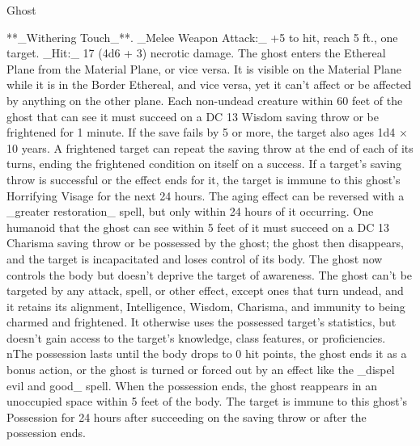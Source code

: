 \begin{DndMonster}[float=*b,width\textwidth + 8pt]{Ghost}
\begin{multicols}{2}
**_Withering Touch_**. _Melee Weapon Attack:_ +5 to hit, reach 5 ft., one target. _Hit:_ 17 (4d6 + 3) necrotic damage.
The ghost enters the Ethereal Plane from the Material Plane, or vice versa. It is visible on the Material Plane while it is in the Border Ethereal, and vice versa, yet it can’t affect or be affected by anything on the other plane.
Each non-undead creature within 60 feet of the ghost that can see it must succeed on a DC 13 Wisdom saving throw or be frightened for 1 minute. If the save fails by 5 or more, the target also ages 1d4 × 10 years. A frightened target can repeat the saving throw at the end of each of its turns, ending the frightened condition on itself on a success. If a target’s saving throw is successful or the effect ends for it, the target is immune to this ghost’s Horrifying Visage for the next 24 hours. The aging effect can be reversed with a _greater restoration_ spell, but only within 24 hours of it occurring.
One humanoid that the ghost can see within 5 feet of it must succeed on a DC 13 Charisma saving throw or be possessed by the ghost; the ghost then disappears, and the target is incapacitated and loses control of its body. The ghost now controls the body but doesn’t deprive the target of awareness. The ghost can’t be targeted by any attack, spell, or other effect, except ones that turn undead, and it retains its alignment, Intelligence, Wisdom, Charisma, and immunity to being charmed and frightened. It otherwise uses the possessed target’s statistics, but doesn’t gain access to the target’s knowledge, class features, or proficiencies.\\nThe possession lasts until the body drops to 0 hit points, the ghost ends it as a bonus action, or the ghost is turned or forced out by an effect like the _dispel evil and good_ spell. When the possession ends, the ghost reappears in an unoccupied space within 5 feet of the body. The target is immune to this ghost’s Possession for 24 hours after succeeding on the saving throw or after the possession ends.
\end{multicols}
\end{DndMonster}
